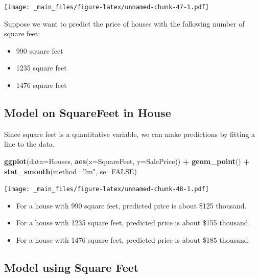\documentclass[]{book}
\newenvironment{Shaded}{\begin{snugshade}}{\end{snugshade}}
\newcommand{\KeywordTok}[1]{\textcolor[rgb]{0.13,0.29,0.53}{\textbf{#1}}}
\newcommand{\DataTypeTok}[1]{\textcolor[rgb]{0.13,0.29,0.53}{#1}}
\newcommand{\StringTok}[1]{\textcolor[rgb]{0.31,0.60,0.02}{#1}}
\newcommand{\OtherTok}[1]{\textcolor[rgb]{0.56,0.35,0.01}{#1}}
\newcommand{\OperatorTok}[1]{\textcolor[rgb]{0.81,0.36,0.00}{\textbf{#1}}}
\newcommand{\NormalTok}[1]{#1}
\providecommand{\tightlist}{%
  \setlength{\itemsep}{0pt}\setlength{\parskip}{0pt}}
\begin{document}
\texttt{[image: \_main\_files/figure-latex/unnamed-chunk-47-1.pdf]}

Suppose we want to predict the price of houses with the following number
of square feet:

\begin{itemize}
\tightlist
\item
  990 square feet\\
\item
  1235 square feet\\
\item
  1476 square feet
\end{itemize}

\subsection{Model on SquareFeet in
House}\label{model-on-squarefeet-in-house}

Since square feet is a quantitative variable, we can make predictions by
fitting a line to the data.

\begin{Shaded}
\begin{Highlighting}[]
\KeywordTok{ggplot}\NormalTok{(}\DataTypeTok{data=}\NormalTok{Houses, }\KeywordTok{aes}\NormalTok{(}\DataTypeTok{x=}\NormalTok{SquareFeet, }\DataTypeTok{y=}\NormalTok{SalePrice)) }\OperatorTok{+}\StringTok{ }\KeywordTok{geom_point}\NormalTok{() }\OperatorTok{+}\StringTok{ }
\StringTok{  }\KeywordTok{stat_smooth}\NormalTok{(}\DataTypeTok{method=}\StringTok{"lm"}\NormalTok{, }\DataTypeTok{se=}\OtherTok{FALSE}\NormalTok{)}
\end{Highlighting}
\end{Shaded}

\texttt{[image: \_main\_files/figure-latex/unnamed-chunk-48-1.pdf]}

\begin{itemize}
\tightlist
\item
  For a house with 990 square feet, predicted price is about \$125
  thousand.\\
\item
  For a house with 1235 square feet, predicted price is about \$155
  thousand.\\
\item
  For a house with 1476 square feet, predicted price is about \$185
  thousand.
\end{itemize}

\subsection{Model using Square Feet}\label{model-using-square-feet}
\end{document}
